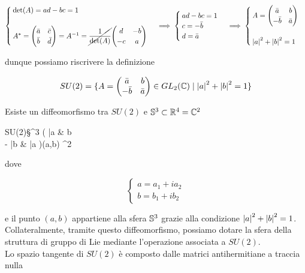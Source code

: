 \begin{equation}
	\begin{cases}
		\det(A) = a d - b c = 1\\\\
		A^{*} = \mqty( \bar{a} & \bar{c} \\ \bar{b} & \bar{d} ) = A^{-1} = \cancel{\dfrac{1}{\det(A)}} \mqty( d & -b \\ -c & a )
	\end{cases}
	\implies%
	\begin{cases}
		a d - b c = 1\\
		c = - \bar{b}\\
		d = \bar{a}
	\end{cases}
	\implies%
	\begin{cases}
		A = \mqty( \bar{a} & b \\ - \bar{b} & \bar{a} )\\\\
		\abs{a}^{2} + \abs{b}^{2} = 1
	\end{cases}
\end{equation}

dunque possiamo riscrivere la definizione

\begin{equation}
	SU(2) = \{ A = \mqty( \bar{a} & b \\ - \bar{b} & \bar{a} ) \in GL_{2}(\C) \mid \abs{a}^{2} + \abs{b}^{2} = 1 \}
\end{equation}

Esiste un diffeomorfismo tra $ SU(2) $ e $ \S^{3} \subset \R^{4} = \C^{2} $

\map{\phi}%
	{SU(2)}{\S^{3}}%
	{\mqty( \bar{a} & b \\ - \bar{b} & \bar{a} )}{(a,b) \in \C^{2}}

dove

\begin{equation}
	\begin{cases}
		a = a_{1} + i a_{2}\\
		b = b_{1} + i b_{2}
	\end{cases}
\end{equation}

e il punto $ (a,b) $ appartiene alla sfera $ \S^{3} $ grazie alla condizione $ \abs{a}^{2} + \abs{b}^{2} = 1 $.\\
Collateralmente, tramite questo diffeomorfismo, possiamo dotare la sfera della struttura di gruppo di Lie mediante l'operazione associata a $ SU(2) $.\\
Lo spazio tangente di $ SU(2) $ è composto dalle matrici antihermitiane a traccia nulla

